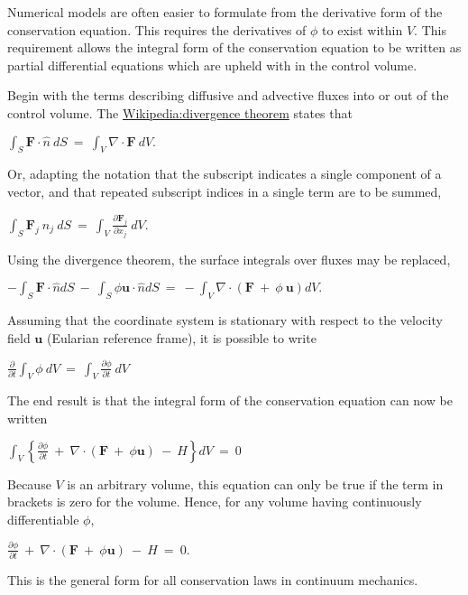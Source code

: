 Numerical models are often easier to formulate from the derivative form
of the conservation equation. This requires the derivatives of $\phi$ to
exist within $V$. This requirement allows the integral form of the
conservation equation to be written as partial differential equations
which are upheld with in the control volume.

Begin with the terms describing diffusive and advective fluxes into or
out of the control volume. The
\href{Wikipedia:divergence theorem}{Wikipedia:divergence theorem} states
that

$
{ \int }_{S} {\mathbf F} {\cdot} \hat{n} ~dS~ = ~{ \int }_{V} \nabla 
    {\cdot} {\mathbf F} ~dV. 
$

Or, adapting the notation that the subscript indicates a single
component of a vector, and that repeated subscript indices in a single
term are to be summed,

$
{ \int }_{ S} {\mathbf F}_{ j} ~n_{ j} ~dS~ = ~{ \int }_{ V} {\frac{
    \partial {\mathbf F}_{ j} }{ \partial x_{ j} }} ~dV.
$

Using the divergence theorem, the surface integrals over fluxes may be
replaced,

$
-{ \int }_{ S} {\mathbf F} {\cdot} \hat{n}dS~ - ~{ \int }_{ S} \phi {\mathbf u}
    {\cdot}\hat{n} dS~ = ~ -{ \int }_{ V} \nabla {\cdot} \left ( {
    {\mathbf F}~ + ~ \phi ~ {\mathbf u}} \right )dV.
$

Assuming that the coordinate system is stationary with respect to the
velocity field $\mathbf{u}$ (Eularian reference frame), it is possible
to write

$
{\frac{ \partial}{ \partial t}} { \int }_{ V} \phi ~dV~ = ~{ \int }_{ V}
    {\frac{ \partial \phi }{ \partial t}} ~dV~
$

The end result is that the integral form of the conservation equation
can now be written

$
{ \int }_{ V} \left\{ {{\frac{ \partial \phi }{ \partial t}}
    ~ + ~ \nabla {\cdot} \left ( { {\mathbf F}~ + ~ \phi {\mathbf u}} \right ) ~
    - ~ H} \right\} dV~ = ~ 0
$

Because $V$ is an arbitrary volume, this equation can only be true if
the term in brackets is zero for the volume. Hence, for any volume
having continuously differentiable $\phi$,

$
{\frac{ \partial \phi }{ \partial t}} ~ + ~ \nabla {\cdot} 
    \left ( { {\mathbf F}~ + ~ \phi {\mathbf u}} \right ) ~ - ~H~ = ~ 0.
$

This is the general form for all conservation laws in continuum
mechanics.


